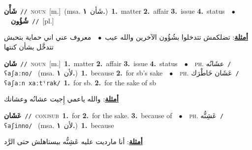\documentclass[10pt,a4paper,twoside]{article} %
\begin{document}
\begin{multicols}{2}
{\setlength\topsep{0pt}\textbf{\foreignlanguage{arabic}{شَأْن}}\ {\color{gray}\texttt{//}\color{black}}\ \textsc{noun}\ [m.]\ \color{gray}(msa. \foreignlanguage{arabic}{شَأن}~\foreignlanguage{arabic}{\textbf{١.}})\color{black}\ \textbf{1.}~matter  \textbf{2.}~affair  \textbf{3.}~issue  \textbf{4.}~status\ \ $\bullet$\ \ \setlength\topsep{0pt}\textbf{\foreignlanguage{arabic}{شُؤُون}}\ {\color{gray}\texttt{//}\color{black}}\ [pl.]\  \begin{flushright}\color{gray}\foreignlanguage{arabic}{\textbf{\underline{\foreignlanguage{arabic}{أمثلة}}}: تضلكمش تتدخلوا بشُؤُون الآخرين والله عيب\ $\bullet$\ \  معروف عني اني حماية بتحبش تتدخَّل بشأن كنتها}\end{flushright}\color{black}} \vspace{2mm}

{\setlength\topsep{0pt}\textbf{\foreignlanguage{arabic}{شَان}}\ {\color{gray}\texttt{//}\color{black}}\ \textsc{noun}\ [m.]\ \textbf{1.}~matter  \textbf{2.}~affair  \textbf{3.}~issue  \textbf{4.}~status\ \ $\bullet$\ \ \textsc{ph.} \color{gray} \foreignlanguage{arabic}{عشَانُه}\color{black}\ {\color{gray}\texttt{/{\sffamily ʕaʃaːno}/}\color{black}}\ \color{gray} (msa. \foreignlanguage{arabic}{لأن}~\foreignlanguage{arabic}{\textbf{١.}})\color{black}\ \textbf{1.}~because  \textbf{2.}~for sb's sake\ \ $\bullet$\ \ \textsc{ph.} \color{gray} \foreignlanguage{arabic}{عَشَان خَاطْرَك}\color{black}\ {\color{gray}\texttt{/{\sffamily ʕaʃaːn xaːtˤrak}/}\color{black}}\ \textbf{1.}~for sb.  \textbf{2.}~for the sake of sb\  \begin{flushright}\color{gray}\foreignlanguage{arabic}{\textbf{\underline{\foreignlanguage{arabic}{أمثلة}}}: والله ياعمي إِجيت عشانُه وعشانك}\end{flushright}\color{black}} \vspace{2mm}

{\setlength\topsep{0pt}\textbf{\foreignlanguage{arabic}{عَشَان}}\ {\color{gray}\texttt{//}\color{black}}\ \textsc{conj\textunderscore sub}\ \textbf{1.}~for  \textbf{2.}~for the sake.  \textbf{3.}~because of\ \ $\bullet$\ \ \textsc{ph.} \color{gray} \foreignlanguage{arabic}{عَشِنُّه}\color{black}\ {\color{gray}\texttt{/{\sffamily ʕaʃinno}/}\color{black}}\ \color{gray} (msa. \foreignlanguage{arabic}{لأن}~\foreignlanguage{arabic}{\textbf{١.}})\color{black}\ \textbf{1.}~because\  \begin{flushright}\color{gray}\foreignlanguage{arabic}{\textbf{\underline{\foreignlanguage{arabic}{أمثلة}}}: أنا مارديت عليه عَشِنُّه بيستاهلش حتى الرَّد}\end{flushright}\color{black}} \vspace{2mm}


\end{multicols}
\end{document}

